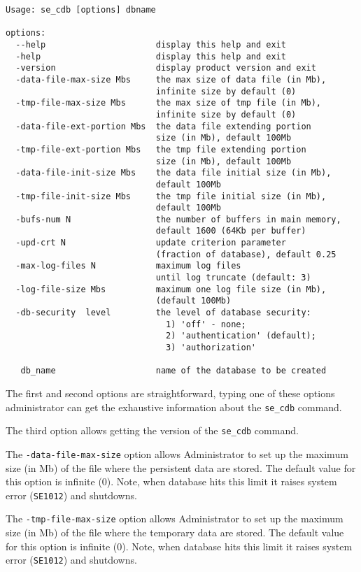 \documentclass[a4paper,12pt]{article}
\begin{document}
\small{
\begin{verbatim}
Usage: se_cdb [options] dbname

options:
  --help                      display this help and exit
  -help                       display this help and exit
  -version                    display product version and exit
  -data-file-max-size Mbs     the max size of data file (in Mb),
                              infinite size by default (0)
  -tmp-file-max-size Mbs      the max size of tmp file (in Mb),
                              infinite size by default (0)
  -data-file-ext-portion Mbs  the data file extending portion
                              size (in Mb), default 100Mb
  -tmp-file-ext-portion Mbs   the tmp file extending portion
                              size (in Mb), default 100Mb
  -data-file-init-size Mbs    the data file initial size (in Mb),
                              default 100Mb
  -tmp-file-init-size Mbs     the tmp file initial size (in Mb),
                              default 100Mb
  -bufs-num N                 the number of buffers in main memory,
                              default 1600 (64Kb per buffer)
  -upd-crt N                  update criterion parameter
                              (fraction of database), default 0.25
  -max-log-files N            maximum log files
                              until log truncate (default: 3)
  -log-file-size Mbs          maximum one log file size (in Mb),
                              (default 100Mb)
  -db-security  level         the level of database security:
                                1) 'off' - none;
                                2) 'authentication' (default);
                                3) 'authorization'

   db_name                    name of the database to be created
\end{verbatim}}

The first and second options are straightforward, typing one of these options
administrator can get the exhaustive information about the \verb!se_cdb!
command.

The third option allows getting the version of the \verb!se_cdb! command.

The \verb!-data-file-max-size! option allows Administrator to set up the maximum
size (in Mb) of the file where the persistent data are stored. The default value
for this option is infinite (0). Note, when database hits this limit it raises
system error (\verb!SE1012!) and shutdowns.

The \verb!-tmp-file-max-size! option allows Administrator to set up the maximum
size (in Mb) of the file where the temporary data are stored. The default value
for this option is infinite (0). Note, when database hits this limit it raises
system error (\verb!SE1012!) and shutdowns.
\end{document}
